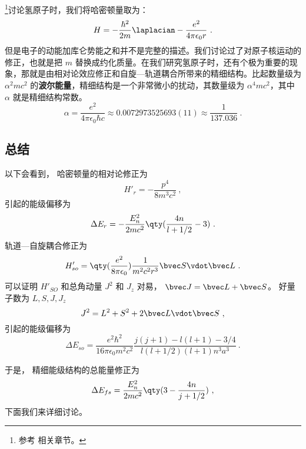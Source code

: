 
\begin{issues}
\issueDraft
\end{issues}

\footnote{参考 \cite{GriffQ} 相关章节。}讨论氢原子时，我们将哈密顿量取为：\begin{equation}
H=-\frac{\hbar^2}{2m}\laplacian-\frac{e^2}{4\pi\epsilon_0 r}~.
\end{equation}
但是电子的动能加库仑势能之和并不是完整的描述。我们讨论过了对原子核运动的修正，也就是把 $m$ 替换成约化质量。在我们研究氢原子时，还有个极为重要的现象，那就是由相对论效应修正和自旋—轨道耦合所带来的精细结构。比起数量级为 $\alpha^2 mc^2$ 的\textbf{波尔能量}，精细结构是一个非常微小的扰动，其数量级为 $\alpha^4 mc^2$，其中 $\alpha$ 就是精细结构常数。
\begin{equation}
\alpha = \frac{e^2}{4\pi\epsilon_0\hbar c} \approx 0.0072973525693(11) \approx \frac{1}{137.036}~.
\end{equation}

\subsection{总结}
以下会看到， 哈密顿量的相对论修正为
\begin{equation}\label{eq_HfineS_2}
H'_r = -\frac{p^4}{8m^3 c^2}~,
\end{equation}
引起的能级偏移为
\begin{equation}
\Delta E_r = -\frac{E_n^2}{2mc^2} \qty(\frac{4n}{l+1/2}-3)~.
\end{equation}
轨道—自旋耦合修正为
\begin{equation}\label{eq_HfineS_3}
H'_{so} = \qty(\frac{e^2}{8\pi\epsilon_0}) \frac{1}{m^2c^2 r^3} \bvec S \vdot \bvec L~.
\end{equation}
可以证明 $H'_{SO}$ 和总角动量 $J^2$ 和 $J_z$ 对易， $\bvec J = \bvec L + \bvec S$。 好量子数为 $L, S, J, J_z$
\begin{equation}
J^2 = L^2 + S^2 + 2\bvec L \vdot \bvec S~,
\end{equation}
引起的能级偏移为
\begin{equation}
\Delta E_{so} = \frac{e^2\hbar^2}{16\pi\epsilon_0 m^2 c^2} \frac{j(j+1) - l(l+1) - 3/4}{l(l+1/2)(l+1)n^3 a^3}~.
\end{equation}

于是， 精细能级结构的总能量修正为
\begin{equation}
\Delta E_{fs} = \frac{E_n^2}{2mc^2}\qty(3 - \frac{4n}{j + 1/2})~,
\end{equation}
下面我们来详细讨论。

